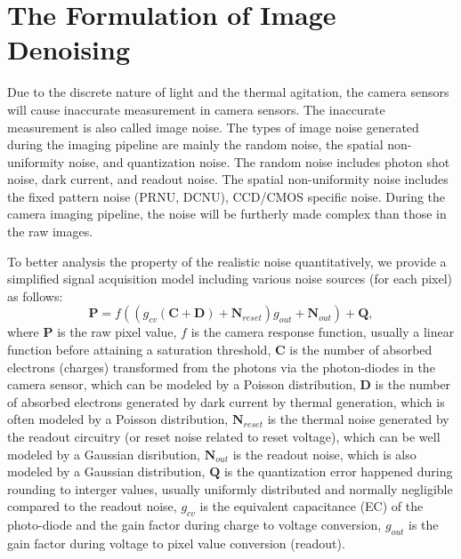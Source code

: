 \section{The Formulation of Image Denoising}
\label{sec:intro:current}

Due to the discrete nature of light and the thermal agitation, the camera sensors will cause inaccurate measurement in camera sensors. The inaccurate measurement is also called image noise. The types of image noise generated during the imaging pipeline are mainly the random noise, the spatial non-uniformity noise, and quantization noise. The random noise includes photon shot noise, dark current, and readout noise. The spatial non-uniformity noise includes the fixed pattern noise (PRNU, DCNU), CCD/CMOS specific noise. During the camera imaging pipeline, the noise will be furtherly made complex than those in the raw images.

To better analysis the property of the realistic noise quantitatively, we provide a simplified signal acquisition model \cite{Foipractical} including various noise sources (for each pixel) as follows:
\begin{equation}
\label{e11}
\bm{P} = f((g_{cv}(\bm{C}+\bm{D})+\bm{N}_{reset})g_{out}+\bm{N}_{out})+\bm{Q},
\end{equation}
where $\bm{P}$ is the raw pixel value, $f$ is the camera response function, usually a linear function before attaining a saturation threshold, $\bm{C}$ is the number of absorbed electrons (charges) transformed from the photons via the photon-diodes in the camera sensor, which can be modeled by a Poisson distribution, $\bm{D}$ is the number of absorbed electrons generated by dark current by thermal generation, which is often modeled by a Poisson distribution, $\bm{N}_{reset}$ is the thermal noise generated by the readout circuitry (or reset noise related to reset voltage), which can be well modeled by a Gaussian disribution, $\bm{N}_{out}$ is the readout noise, which is also modeled by a Gaussian distribution, $\bm{Q}$ is the quantization error happened during rounding to interger values, usually uniformly distributed and normally negligible compared to the readout noise, $g_{cv}$ is the equivalent capacitance (EC) of the photo-diode and the gain factor during charge to voltage conversion, $g_{out}$ is the gain factor during voltage to pixel value conversion (readout).

